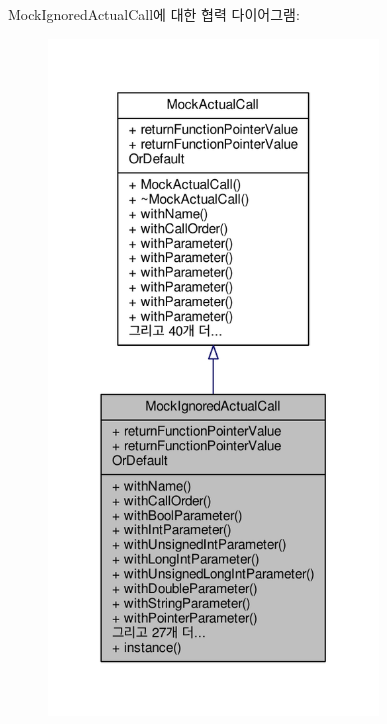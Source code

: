 Mock\+Ignored\+Actual\+Call에 대한 협력 다이어그램\+:
\nopagebreak
\begin{figure}[H]
\begin{center}
\leavevmode
\includegraphics[width=248pt]{class_mock_ignored_actual_call__coll__graph}
\end{center}
\end{figure}
